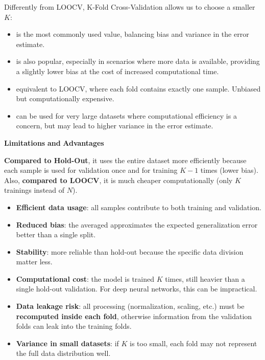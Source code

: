 Differently from LOOCV, K-Fold Cross-Validation allows us to choose a smaller $K$:
\begin{itemize}
    \item {} is the most commonly used value, balancing bias and variance in the error estimate.
    \item {} is also popular, especially in scenarios where more data is available, providing a slightly lower bias at the cost of increased computational time.
    \item {} equivalent to LOOCV, where each fold contains exactly one sample. Unbiased but computationally expensive.
    \item {} can be used for very large datasets where computational efficiency is a concern, but may lead to higher variance in the error estimate.
\end{itemize}

\highspace
\begin{flushleft}
    \textcolor{Red2}{ \textbf{Limitations}} \textbf{and} \textcolor{Green3}{ \textbf{Advantages}}
\end{flushleft}
\textbf{Compared to Hold-Out}, it uses the entire dataset more efficiently because each sample is used for validation once and for training $K-1$ times (lower bias). Also, \textbf{compared to LOOCV}, it is much cheaper computationally (only $K$ trainings instead of $N$).
\begin{itemize}
    \item[\textcolor{Green3}{\faIcon{check}}] \textcolor{Green3}{\textbf{Efficient data usage}}: all samples contribute to both training and validation.
    \item[\textcolor{Green3}{\faIcon{check}}] \textcolor{Green3}{\textbf{Reduced bias}}: the averaged approximates the expected generalization error better than a single split.
    \item[\textcolor{Green3}{\faIcon{check}}] \textcolor{Green3}{\textbf{Stability}}: more reliable than hold-out because the specific data division matter less.
    \item[\textcolor{Red2}{\faIcon{times}}] \textcolor{Red2}{\textbf{Computational cost}}: the model is trained $K$ times, still heavier than a single hold-out validation. For deep neural networks, this can be impractical.
    \item[\textcolor{Red2}{\faIcon{times}}] \textcolor{Red2}{\textbf{Data leakage risk}}: all processing (normalization, scaling, etc.) must be \textbf{recomputed inside each fold}, otherwise information from the validation folds can leak into the training folds.
    \item[\textcolor{Red2}{\faIcon{times}}] \textcolor{Red2}{\textbf{Variance in small datasets}}: if $K$ is too small, each fold may not represent the full data distribution well. 
\end{itemize}
